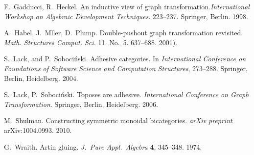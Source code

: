 \documentclass{amsart}
\theoremstyle{remark}
\theoremstyle{definition}
\begin{document}
\begin{thebibliography}{99}
 F.\ Gadducci, R.\ Heckel. An inductive
  view of graph transformation.\emph{International Workshop on
    Algebraic Development Techniques}. 223--237. Springer, Berlin. 1998.

 A.~Habel, J.~Mller,
  D.~Plump. Double-pushout graph transformation
  revisited. \emph{Math. Structures Comput. Sci.}
  11. No.~5. 637--688. 2001).
  
 S.\ Lack, and P.\ Soboci\'{n}ski. Adhesive
  categories. In \emph{International Conference on Foundations of
    Software Science and Computation Structures}, 273--288. Springer,
  Berlin, Heidelberg. 2004.

 S.~Lack, P.~Soboci\'{n}ski. Toposes are adhesive. \emph{International Conference on Graph Transformation}. Springer, Berlin, Heidelberg. 2006.

 M.~Shulman. Constructing symmetric monoidal bicategories. \emph{arXiv preprint} arXiv:1004.0993. 2010.
  
 G.\ Wraith. Artin gluing. \emph{J.\ Pure
    Appl.\ Algebra} \textbf{4}, 345--348. 1974.

\end{thebibliography}
\end{document}
